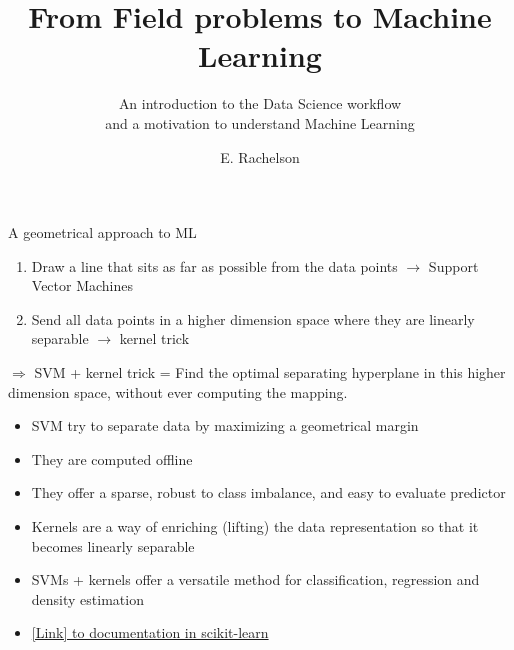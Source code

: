 \documentclass{beamer}
\title[A few topics in Reinforcement Learning]{From Field problems to Machine Learning}
\subtitle{An introduction to the Data Science workflow\\and a motivation to understand Machine Learning}
\author{E. Rachelson}
\institute{\texttt{[image: img/isae.jpg]}}
\date{}
\begin{document}
\begin{frame}{A geometrical approach to ML}
\begin{block}{}
\begin{enumerate}
\item Draw a line that sits as far as possible from the data points $\rightarrow$ Support Vector Machines
\item Send all data points in a higher dimension space where they are linearly separable $\rightarrow$ kernel trick
\end{enumerate}
$\Rightarrow$ SVM + kernel trick = Find the optimal separating hyperplane in this higher dimension space, without ever computing the mapping.
\end{block}

\begin{itemize}
\item SVM try to separate data by maximizing a geometrical margin
\item They are computed offline
\item They offer a sparse, robust to class imbalance, and easy to evaluate predictor
\item Kernels are a way of enriching (lifting) the data representation so that it becomes linearly separable
\item SVMs + kernels offer a versatile method for classification, regression and density estimation
\item \href{http://scikit-learn.org/stable/modules/svm.html}{[Link] to documentation in scikit-learn}
\end{itemize}
\end{frame}
\end{document}
